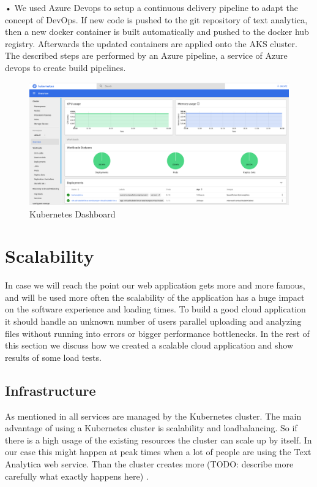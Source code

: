 \documentclass[conference]{IEEEtran}
\begin{document}
•	We used Azure Devops to setup a continuous delivery pipeline to adapt the concept of DevOps. If new code is pushed to the git repository of text analytica, then a new docker container is built automatically and pushed to the docker hub registry. Afterwards the updated containers are applied onto the AKS cluster. The described steps are performed by an Azure pipeline, a service of Azure devops to create build pipelines.

\begin{figure}[ht!]
\includegraphics[width=170mm]{img/Kubernetes_Dashboard.png}
\caption{Kubernetes Dashboard}
\label{img:kubernetes-dashboard}
\end{figure}

\section{Scalability}
\label{sec:scalability}
In case we will reach the point our web application gets more and more famous, and will be used more often the scalability of the application has a huge impact on the software experience and loading times. To build a good cloud application it should handle an unknown number of users parallel uploading and analyzing files without running into errors or bigger performance bottlenecks. In the rest of this section we discuss how we created a scalable cloud application and show results of some load tests.

\subsection{Infrastructure}
As mentioned in  all services are managed by the Kubernetes cluster.
The main advantage of using a Kubernetes cluster is scalability and loadbalancing. So if there is a high usage of the
existing resources the cluster can scale up by itself. In our case this might happen at peak times when a lot of people
are using the Text Analytica web service. Than the cluster creates more (TODO:  describe more carefully what exactly happens here)
\cite{MicrosoftAzureKubernetesService}.
\end{document}

